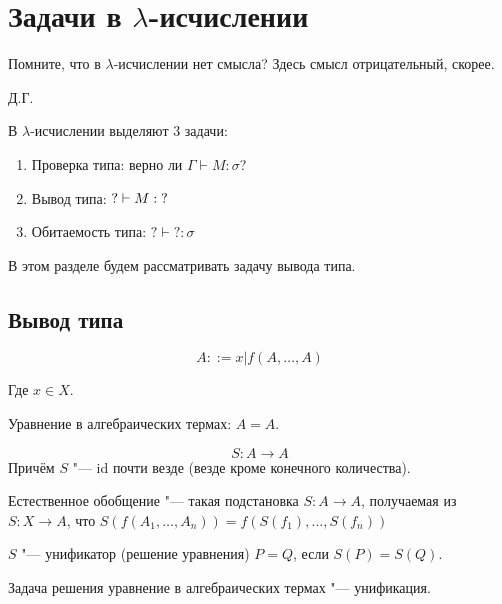 \section{\texorpdfstring{Задачи в $\lambda$-исчислении}{Link to programming}}
\epigraph{Помните, что в $\lambda$-исчислении нет смысла? Здесь смысл отрицательный, скорее.}{Д.Г.}

В $\lambda$-исчислении выделяют 3 задачи:
\begin{enumerate}[label=(\asbuk*)]
    \item Проверка типа: верно ли $\Gamma \vdash M : \sigma$?
    \item Вывод типа: $? \vdash M : \mathinner{?}$
    \item Обитаемость типа: $? \vdash ? : \sigma$
\end{enumerate}

В этом разделе будем рассматривать задачу вывода типа.

\subsection{\texorpdfstring{Вывод типа}{Type deduction}}

\begin{definition}
    \begin{bnf}
    \[
        A ::= x | f\left(A, \ldots, A\right)
    \]
    \end{bnf}
    Где $x \in X$.
\end{definition}

Уравнение в алгебраических термах: $A = A$.

\begin{definition}[$S$-подстановка]
    \[
        S : A \rightarrow A
    \]
    Причём $S$ "--- id почти везде (везде кроме конечного количества).
\end{definition}

\begin{definition}
    Естественное обобщение "--- такая подстановка $S : A \rightarrow A$, получаемая из $S : X \rightarrow A$, что
    $S\left(f\left(A_1, \dots, A_n\right)\right) = f\left(S(f_1), \ldots, S(f_n)\right)$
\end{definition}

\begin{definition}[унификатор]
    $S$ "--- унификатор (решение уравнения) $P=Q$, если $S(P)=S(Q)$.
\end{definition}
Задача решения уравнение в алгебраических термах "--- унификация.

